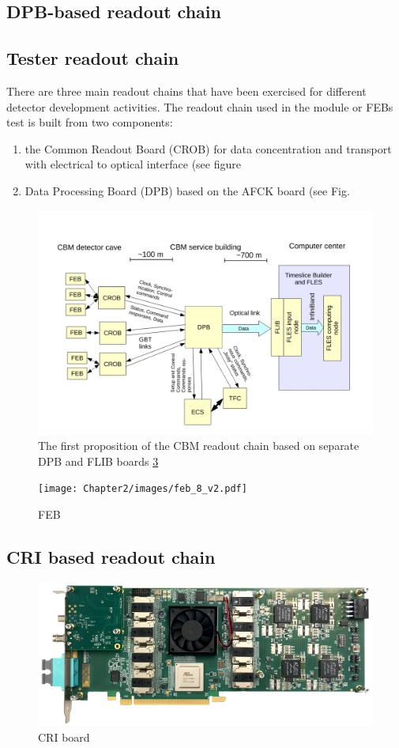 \subsection{DPB-based readout chain}

\subsection{Tester readout chain}

There are three main readout chains that have been exercised for different detector development activities.  
The readout chain used in the module or FEBs test is built from two components: 
\begin{enumerate}
    \item the Common Readout Board (\gls{CROB}) for data concentration and transport with electrical to optical interface (see figure 
    \item Data Processing Board (DPB) based on the AFCK board (see Fig.
\end{enumerate}

\begin{figure}[!h]
\centering
\includegraphics[width=0.65\columnwidth]{Chapter2/images/DPB.png}
\caption{The first proposition of the CBM readout chain based on separate DPB and FLIB boards \ref{fig_cri_board}}
\label{fig_dpb_scheme}
\end{figure}

\begin{figure}[!h]
\centering
\texttt{[image: Chapter2/images/feb\_8\_v2.pdf]}
\caption{FEB}
\label{fig_febA_photo}
\end{figure}
\subsection{CRI based readout chain}
\begin{figure}[!h]
\centering
\includegraphics[width=0.65\columnwidth]{Chapter2/images/cri_board_atlas.pdf}
\caption{CRI board}
\label{fig_cri_board}
\end{figure}

